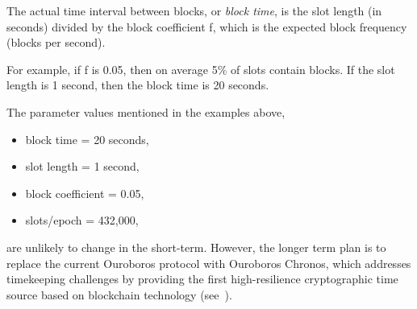 \begin{definition}
  The actual time interval between blocks, or \emph{block time}, is the slot length
  (in seconds) divided by the block coefficient f, which is the expected block
  frequency (blocks per second).
\end{definition}
For example, if f is 0.05, then on average 5\% of slots contain blocks.
If the slot length is 1 second, then the block time is 20 seconds.

The parameter values mentioned in the examples above,
\begin{itemize}[noitemsep]
  \item block time = 20 seconds,
  \item slot length = 1 second,
  \item block coefficient = 0.05,
  \item slots/epoch = 432,000,
\end{itemize}
are unlikely to change in the short-term.  However, the longer term plan is to replace the current Ouroboros  protocol with Ouroboros Chronos, which addresses timekeeping challenges by providing the first
high-resilience cryptographic time source based on blockchain technology (see~\textcite{www-iohk-blog-ouroboros}).
